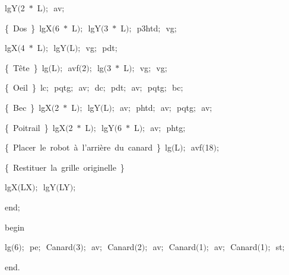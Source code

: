 {\vspace{\neglskip}\mbox{\blc  \blk\blk\blk\blk\idt  lgY$($2\ $\ast$\ L$)$$;$\ av$;$\ }\par 
\vspace{\neglskip}\mbox{\blc  \blk\blk\blk\blk\idt  \cmt  \{\ Dos\ \}\idt \ lgX$($6\ $\ast$\ L$)$$;$\ lgY$($3\ $\ast$\ L$)$$;$\ p3htd$;$\ vg$;$\ }\par 
\vspace{\neglskip}\mbox{\blc  \blk\blk\blk\blk\idt  lgX$($4\ $\ast$\ L$)$$;$\ lgY$($L$)$$;$\ vg$;$\ pdt$;$\ }\par 
\vspace{\neglskip}\mbox{\blc  \blk\blk\blk\blk\idt  \cmt  \{\ Tête\ \}\idt \ lg$($L$)$$;$\ avf$($2$)$$;$\ lg$($3\ $\ast$\ L$)$$;$\ vg$;$\ vg$;$\ }\par 
\vspace{\neglskip}\mbox{\blc  \blk\blk\blk\blk\idt  \cmt  \{\ Oeil\ \}\idt \ lc$;$\ pqtg$;$\ av$;$\ dc$;$\ pdt$;$\ av$;$\ pqtg$;$\ bc$;$}\par 
\vspace{\neglskip}\mbox{\blc  \blk\blk\blk\blk\idt  \cmt  \{\ Bec\ \}\idt \ lgX$($2\ $\ast$\ L$)$$;$\ lgY$($L$)$$;$\ av$;$\ phtd$;$\ av$;$\ pqtg$;$\ av$;$\ }\par 
\vspace{\neglskip}\mbox{\blc  \blk\blk\blk\blk\idt  \cmt  \{\ Poitrail\ \}\idt \ lgX$($2\ $\ast$\ L$)$$;$\ lgY$($6\ $\ast$\ L$)$$;$\ av$;$\ phtg$;$\ }\par 
\vspace{\neglskip}\mbox{\blc  \blk\blk\blk\blk\idt  \cmt  \{\ Placer\ le\ robot\ à\ l{'}arrière\ du\ canard\ \}\idt \ lg$($L$)$$;$\ avf$($18$)$$;$}\par 
\vspace{\neglskip}\mbox{\blc  \blk\blk\idt  \cmt  \{\ Restituer\ la\ grille\ originelle\ \}\idt }\par 
\vspace{\neglskip}\mbox{\blc  \blk\blk\blk\blk\idt  lgX$($LX$)$$;$\ lgY$($LY$)$$;$}\par 
\vspace{\neglskip}\mbox{\blc  \blk\idt  \mcl end\idt $;$}\par 
\medskip

\vspace{\neglskip}\mbox{\blc  \idt  \mcl begin\idt }\par 
\vspace{\neglskip}\mbox{\blc  \blk\idt  lg$($6$)$$;$\ pe$;$\ Canard$($3$)$$;$\ av$;$\ Canard$($2$)$$;$\ av$;$\ Canard$($1$)$$;$\ av$;$\ Canard$($1$)$$;$\ st$;$}\par 
\vspace{\neglskip}\mbox{\blc  \idt  \mcl end\idt $.$}\par 

\medskip }

